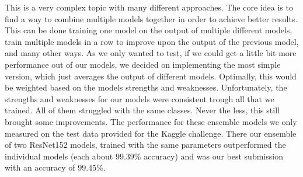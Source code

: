 \label{ensembling}
This is a very complex topic with many different approaches. The core idea is to find a way to combine multiple models together in order to achieve better results. This can be done training one model on the output of multiple different models, train multiple models in a row to improve upon the output of the previous model, and many other ways. As we only wanted to test, if we could get a little bit more performance out of our models, we decided on implementing the most simple version, which just averages the output of different models. Optimally, this would be weighted based on the models strengths and weaknesses. Unfortunately, the strengths and weaknesses for our models were consistent trough all that we trained. All of them struggled with the same classes. Never the less, this still brought some improvements. The performance for these ensemble models we only measured on the test data provided for the Kaggle challenge. There our ensemble of two ResNet152 models, trained with the same parameters outperformed the individual models (each about 99.39\% accuracy) and was our best submission with an accuracy of 99.45\%.  